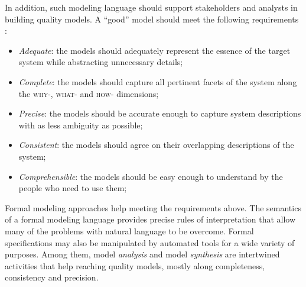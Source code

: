 In addition, such modeling language should support stakeholders and analysts in building quality models. A ``good'' model should meet the following requirements \cite{VanLamsweerde:2009}:

\begin{itemize}
\item \emph{Adequate}: the models should adequately represent the essence of the target system while abstracting unnecessary details;
\item \emph{Complete}: the models should capture all pertinent facets of the system along the \textsc{why-}, \textsc{what-} and \textsc{how-} dimensions;
\item \emph{Precise}: the models should be accurate enough to capture system descriptions with as less ambiguity as possible;
\item \emph{Consistent}: the models should agree on their overlapping descriptions of the system;
\item \emph{Comprehensible}: the models should be easy enough to understand by the people who need to use them;
\end{itemize}

Formal modeling approaches help meeting the requirements above. The semantics of a formal modeling language provides precise rules of interpretation that allow many of the problems with natural language to be overcome. Formal specifications may also be manipulated by automated tools for a wide variety of purposes. Among them, model \emph{analysis} and model \emph{synthesis} are intertwined activities that help reaching quality models, mostly along completeness, consistency  and precision.


